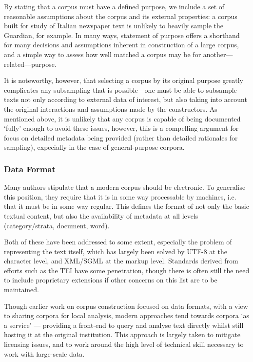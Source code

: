 By stating that a corpus must have a defined purpose, we include a set of reasonable assumptions about the corpus and its external properties: a corpus built for study of Italian newspaper text is unlikely to heavily sample the Guardian, for example.  In many ways, statement of purpose offers a shorthand for many decisions and assumptions inherent in construction of a large corpus, and a simple way to assess how well matched a corpus may be for another---related---purpose.

It is noteworthy, however, that selecting a corpus by its original purpose greatly complicates any subsampling that is possible---one must be able to subsample texts not only according to external data of interest, but also taking into account the original interactions and assumptions made by the constructors.  As mentioned above, it is unlikely that any corpus is capable of being documented `fully' enough to avoid these issues, however, this is a compelling argument for focus on detailed metadata being provided (rather than detailed rationales for sampling), expecially in the case of general-purpose corpora.






\subsubsection{Data Format}
Many authors stipulate that a modern corpus should be electronic.  To generalise this position, they require that it is in some way processable by machines, i.e. that it must be in some way regular.
This defines the format of not only the basic textual content, but also the availability of metadata at all levels (category/strata, document, word).

Both of these have been addressed to some extent, especially the problem of representing the text itself, which has largely been solved by UTF-8 at the character level, and XML/SGML at the markup level.  Standards derived from efforts such as the TEI\cite{ide1995tei} have some penetration, though there is often still the need to include proprietary extensions if other concerns on this list are to be maintained.

Though earlier work on corpus construction focused on data formats\cite{atkins1992corpus,EagTcwgCtypeaglespreliminary}, with a view to sharing corpora for local analysis, modern approaches tend towards corpora `as a service'\cite{hardie2012cqpweb,ferraresi2008introducing} --- providing a front-end to query and analyse text directly whilst still hosting it at the original institution.  This approach is largely taken to mitigate licensing issues, and to work around the high level of technical skill necessary to work with large-scale data.

